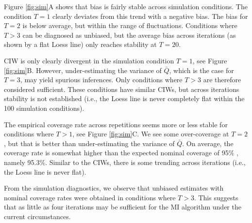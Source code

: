 \documentclass[article]{jss}
\begin{document}
Figure \ref{fig:sim}A shows that bias is fairly stable across simulation conditions. The condition $T=1$ clearly deviates from this trend with a negative bias. The bias for $T=2$ is below average, but within the range of fluctuations. Conditions where $T>3$ can be diagnosed as unbiased, but the average bias across iterations (as shown by a flat Loess line) only reaches stability at $T=20$. 

CIW is only clearly divergent in the simulation condition $T=1$, see Figure \ref{fig:sim}B. However, under-estimating the variance of $\bar{Q}$, which is the case for $T=3$, may yield spurious inferences. Only conditions where $T>3$ are therefore considered sufficient. These conditions have similar CIWs, but across iterations stability is not established (i.e., the Loess line is never completely flat within the 100 simulation conditions).%

The empirical coverage rate across repetitions seems more or less stable for conditions where $T>1$, see Figure \ref{fig:sim}C. We see some over-coverage at $T=2$, but that is better than under-estimating the variance of $\bar{Q}$. On average, the coverage rate is somewhat higher than the expected nominal coverage of 95\% \citep{neym34}, namely 95.3\%. Similar to the CIWs, there is some trending across iterations (i.e., the Loess line is never flat).

From the simulation diagnostics, we observe that unbiased estimates with nominal coverage rates were obtained in conditions where $T>3$. This suggests that as little as four iterations may be sufficient for the MI algorithm under the current circumstances. %
\end{document}
